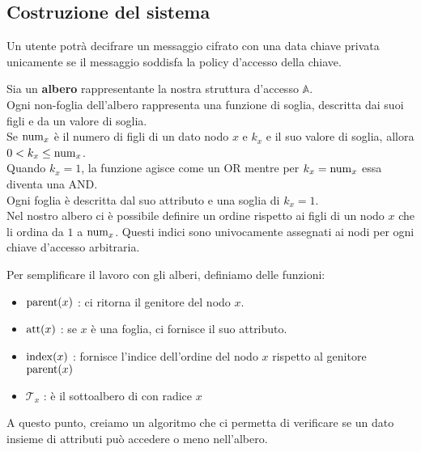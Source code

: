 \subsection{Costruzione del sistema} 

Un utente potrà decifrare un messaggio cifrato con una data chiave privata unicamente se il messaggio soddisfa la policy d'accesso della chiave.\\[0,5cm]

\begin{defi}
Sia  un \textbf{albero} rappresentante la nostra struttura d'accesso $\mathbb{A}$.\\
Ogni non-foglia dell'albero rappresenta una funzione di soglia, descritta dai suoi figli e da un valore di soglia.\\
Se $\operatorname{num}_x$ è il numero di figli di un dato nodo $x$ e $k_x$ e il suo valore di soglia, allora $0 < k_x \leq \operatorname{num}_x$.\\
Quando $k_x = 1$, la funzione agisce come un OR mentre per $k_x = \operatorname{num}_x$ essa diventa una AND.\\
Ogni foglia è descritta dal suo attributo e una soglia di $k_x = 1$.\\
Nel nostro albero ci è possibile definire un ordine rispetto ai figli di un nodo $x$ che li ordina da $1$ a $\operatorname{num}_x$. Questi indici sono univocamente assegnati ai nodi per ogni chiave d'accesso arbitraria.
\end{defi}


Per semplificare il lavoro con gli alberi, definiamo delle funzioni:
\begin{itemize}
\item $\operatorname{parent}(x)$ : ci ritorna il genitore del nodo $x$.
\item $\operatorname{att}(x)$ : se $x$ è una foglia, ci fornisce il suo attributo.
\item $\operatorname{index}(x)$ : fornisce l'indice dell'ordine del nodo $x$ rispetto al genitore $\operatorname{parent}(x)$
\item $\mathcal{T}_x$ : è il sottoalbero di  con radice $x$ 
\end{itemize}

\vspace{0.8cm}
A questo punto, creiamo un algoritmo che ci permetta di verificare se un dato insieme di attributi può accedere o meno nell'albero.


